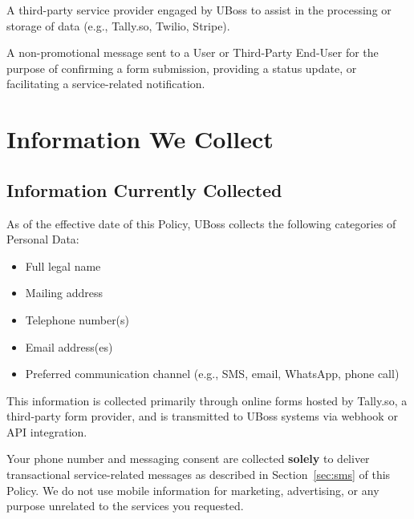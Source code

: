 \documentclass[11pt, letterpaper]{article}
\begin{document}
\begin{description}[style=nextline, leftmargin=1em, font=\bfseries\color{ubossdarkgray}]
    \item[Subprocessor]
    A third-party service provider engaged by UBoss to assist in the processing or
    storage of data (e.g., Tally.so, Twilio, Stripe).

    \item[Transactional Communication]
    A non-promotional message sent to a User or Third-Party End-User for the purpose of
    confirming a form submission, providing a status update, or facilitating a
    service-related notification.

\end{description}

\section{Information We Collect}

\subsection{Information Currently Collected}

As of the effective date of this Policy, UBoss collects the following categories of
Personal Data:

\begin{itemize}
    \item Full legal name
    \item Mailing address
    \item Telephone number(s)
    \item Email address(es)
    \item Preferred communication channel (e.g., SMS, email, WhatsApp, phone call)
\end{itemize}

This information is collected primarily through online forms hosted by Tally.so, a
third-party form provider, and is transmitted to UBoss systems via webhook or API
integration.

\begin{tcolorbox}[keysummary, title={How We Use Your Mobile Information}]
Your phone number and messaging consent are collected \textbf{solely} to deliver
transactional service-related messages as described in Section~\ref{sec:sms} of this
Policy. We do not use mobile information for marketing, advertising, or any purpose
unrelated to the services you requested.
\end{tcolorbox}
\end{document}
